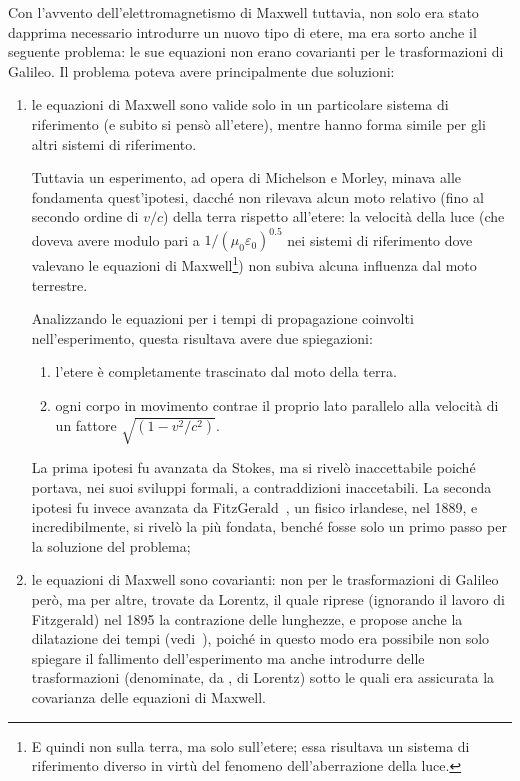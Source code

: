 Con l'avvento dell'elettromagnetismo di Maxwell tuttavia, non solo era
stato dapprima necessario introdurre un nuovo tipo di etere, ma era
sorto anche il seguente problema: le sue equazioni non erano
covarianti per le trasformazioni di Galileo. Il problema poteva
avere principalmente due soluzioni:
\begin{enumerate}
\item le equazioni di Maxwell sono valide solo in un particolare
  sistema di riferimento (e subito si pens\`o all'etere), mentre hanno
  forma simile per gli altri
  sistemi di riferimento.

  Tuttavia un esperimento, ad opera di Michelson e Morley, minava alle
  fondamenta quest'ipotesi, dacch\'e non rilevava alcun moto relativo
  (fino al secondo ordine di $v / c$) della terra rispetto all'etere: la
  velocit\`a della luce (che doveva avere modulo pari a $1/(\mu_0
      \varepsilon_0)^{0.5}$ nei sistemi di
  riferimento dove valevano le equazioni di Maxwell\footnote{E quindi
      non sulla terra, ma solo sull'etere; essa risultava un sistema di
      riferimento diverso in virt\`u del fenomeno dell'aberrazione della
      luce.}) non subiva alcuna influenza dal moto terrestre.

  Analizzando le equazioni per i tempi di propagazione coinvolti
  nell'esperimento, questa risultava avere due spiegazioni:
  \begin{enumerate}
  \item l'etere \`e completamente trascinato dal moto della terra.
  \item ogni corpo in movimento contrae il proprio lato parallelo alla
    velocit\`a di un fattore $\sqrt{(1-v^{2}/c^{2})}$.
  \end{enumerate}
  La prima ipotesi fu avanzata da Stokes, ma si rivel\`o inaccettabile
  poich\'e portava, nei suoi sviluppi formali, a contraddizioni
  inaccetabili.%
  \newline%
  La seconda ipotesi fu invece avanzata da
  FitzGerald~\cite{fitz}, un fisico irlandese, nel 1889, e
  incredibilmente, si rivel\`o la pi\`u fondata, bench\'e fosse solo un
  primo passo per la soluzione del problema;

\item le equazioni di Maxwell sono covarianti: non per le
  trasformazioni di Galileo per\`o, ma per altre, trovate da Lorentz, 
  il quale riprese (ignorando il lavoro di Fitzgerald) nel 1895 la
contrazione delle lunghezze, e propose anche la dilatazione dei tempi
(vedi~\cite{loris1895}), poich\'e in questo modo era possibile non solo
spiegare il fallimento dell'esperimento ma anche introdurre delle
trasformazioni (denominate, da \poin, di Lorentz) sotto le quali era
assicurata la covarianza delle equazioni di Maxwell.
\end{enumerate}

